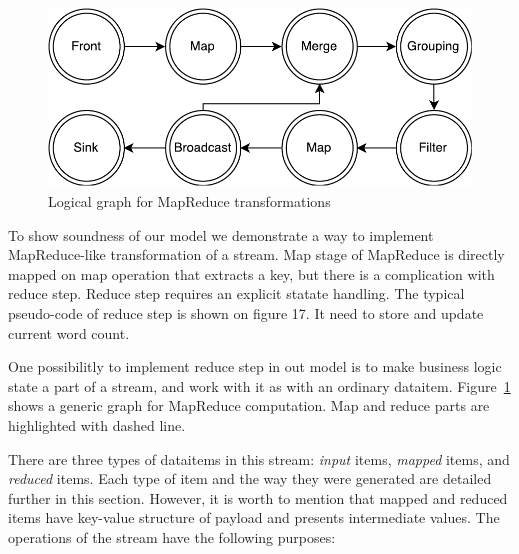 
\label {fs-mapreduce}

\begin{figure}[htb]
  \centering
  \includegraphics[scale=0.5]{pics/mapreduce}
  \caption{Logical graph for MapReduce transformations}
  \label {mapreduce-graph-figure}
\end{figure}

To show soundness of our model we demonstrate a way to implement MapReduce-like transformation of a stream. Map stage of MapReduce is directly mapped on map operation that extracts a key, but there is a complication with reduce step. Reduce step requires an explicit statate handling. The typical pseudo-code of reduce step is shown on figure 17. It need to store and update current word count.

One possibilitly to implement reduce step in out model is to make business logic state a part of a stream, and work with it as with an ordinary dataitem. Figure~\ref{mapreduce-graph-figure} shows a generic graph for MapReduce computation. Map and reduce parts are highlighted with dashed line.

There are three types of dataitems in this stream: {\it input} items, {\it mapped} items, and {\it reduced} items. Each type of item and the way they were generated are detailed further in this section. However, it is worth to mention that mapped and reduced items have key-value structure of payload and presents intermediate values. The operations of the stream have the following purposes:

